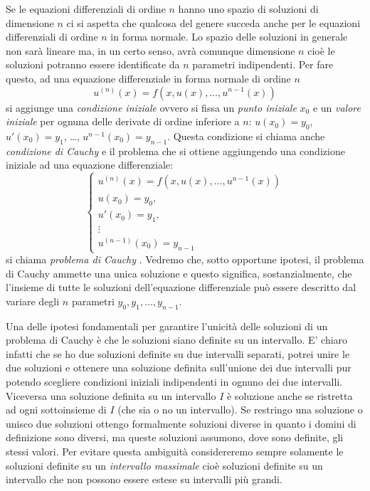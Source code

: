 Se le equazioni differenziali di ordine $n$ hanno uno spazio di
soluzioni di
dimensione $n$ ci si aspetta che qualcosa del genere succeda anche
per le equazioni differenziali di ordine $n$ in forma normale.
Lo spazio delle soluzioni in generale non sarà lineare ma, in un certo senso,
avrà comunque dimensione $n$ cioè le soluzioni potranno essere identificate
da $n$ parametri indipendenti.
Per fare questo, ad una equazione differenziale in forma normale
di ordine $n$
\[
u^{(n)}(x) = f(x, u(x), \dots, u^{n-1}(x))
\]
si aggiunge una \emph{condizione iniziale}%
 ovvero si fissa un
\emph{punto iniziale} $x_0$ e un \emph{valore iniziale}
per ognuna delle derivate di ordine inferiore a $n$:
$u(x_0) = y_0$, $u'(x_0)=y_1$, \dots, $u^{n-1}(x_0) = y_{n-1}$.
Questa condizione
si chiama anche \emph{condizione di Cauchy} e il problema
che si ottiene aggiungendo una condizione iniziale ad una
equazione differenziale:
\[
  \begin{cases}
  u^{(n)}(x) = f(x, u(x), \dots, u^{n-1}(x))\\
  u(x_0) = y_0, \\
  u'(x_0) = y_1, \\
  \vdots\\
  u^{(n-1)}(x_0) = y_{n-1}
  \end{cases}
\]
si chiama \emph{problema di Cauchy}%
.
Vedremo che, sotto opportune ipotesi, il problema di Cauchy
ammette una unica soluzione e questo significa, sostanzialmente,
che l'insieme di tutte le soluzioni dell'equazione differenziale
può essere descritto dal variare
degli $n$ parametri $y_0, y_1, \dots, y_{n-1}$.

Una delle ipotesi fondamentali per garantire l'unicità delle
soluzioni di un problema di Cauchy è che le soluzioni siano
definite su un intervallo. E' chiaro infatti che se ho due
soluzioni definite su due intervalli separati, potrei unire
le due soluzioni e ottenere una soluzione definita sull'unione dei
due intervalli pur potendo scegliere condizioni iniziali 
indipendenti in ognuno dei due intervalli. 
Viceversa una soluzione definita
su un intervallo $I$ è soluzione anche se ristretta ad ogni sottoinsieme
di $I$ (che sia o no un intervallo).
Se restringo una soluzione o unisco due soluzioni ottengo formalmente
soluzioni diverse in quanto i domini di definizione sono diversi, ma
queste soluzioni assumono, dove sono definite, gli stessi valori.
Per evitare questa ambiguità considereremo sempre solamente
le soluzioni definite su un \emph{intervallo massimale}%
 cioè
soluzioni definite su un intervallo che non possono essere
estese su intervalli più grandi.


